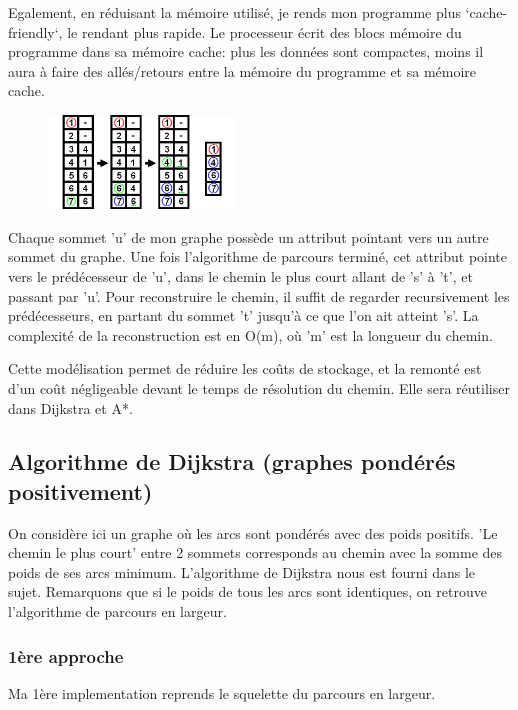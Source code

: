 \documentclass[10pt]{article}
\begin{document}
			Egalement, en réduisant la mémoire utilisé, je rends mon programme plus `cache-friendly`, le rendant plus rapide.
			Le processeur écrit des blocs mémoire du programme dans sa mémoire cache: plus les données sont compactes,
			moins il aura à faire des allés/retours entre la mémoire du programme et sa mémoire cache.\newline
							

			\begin{figure}
				\includegraphics[width=5cm]{./images/remonte.png}
			\end{figure}

			Chaque sommet 'u' de mon graphe possède un attribut pointant vers un autre sommet du graphe.
			Une fois l'algorithme de parcours terminé, cet attribut pointe vers le prédécesseur de 'u',
			dans le chemin le plus court allant de 's' à 't', et passant par 'u'.
			Pour reconstruire le chemin, il suffit de regarder recursivement les prédécesseurs, en partant du sommet
			't' jusqu'à ce que l'on ait atteint 's'.
			La complexité de la reconstruction est en O(m), où 'm' est la longueur du chemin.\newline
			
			Cette modélisation permet de réduire les coûts de stockage, et la remonté est d'un coût
			négligeable devant le temps de résolution du chemin. Elle sera réutiliser dans Dijkstra et A*.
			
		\subsection{Algorithme de Dijkstra (graphes pondérés positivement)}
			On considère ici un graphe où les arcs sont pondérés avec des poids positifs.\newline
			'Le chemin le plus court' entre 2 sommets corresponds au chemin avec la somme des poids de ses arcs minimum.\newline
			L'algorithme de Dijkstra nous est fourni dans le sujet. Remarquons que si le poids de tous les arcs sont identiques,
			on retrouve l'algorithme de parcours en largeur.
			\subsubsection{1ère approche}
				Ma 1ère implementation reprends le squelette du parcours en largeur.
				
\end{document}
